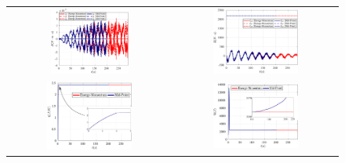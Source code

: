 \begin{figure}[hbtp!]
	\centering
	\begin{tabular}{cc}
		\includegraphics[width=0.5\textwidth]{Figures/Example2/EnergyBalance/J.eps} &
		\includegraphics[width=0.55\textwidth]{Figures/Example2/EnergyBalance/L.eps}\\
		\includegraphics[width=0.55\textwidth]{Figures/Example2/EnergyBalance/TheEntropy.eps} &
		\includegraphics[width=0.55\textwidth]{Figures/Example2/EnergyBalance/HFinal.eps}\\

\end{tabular}
\end{figure}
